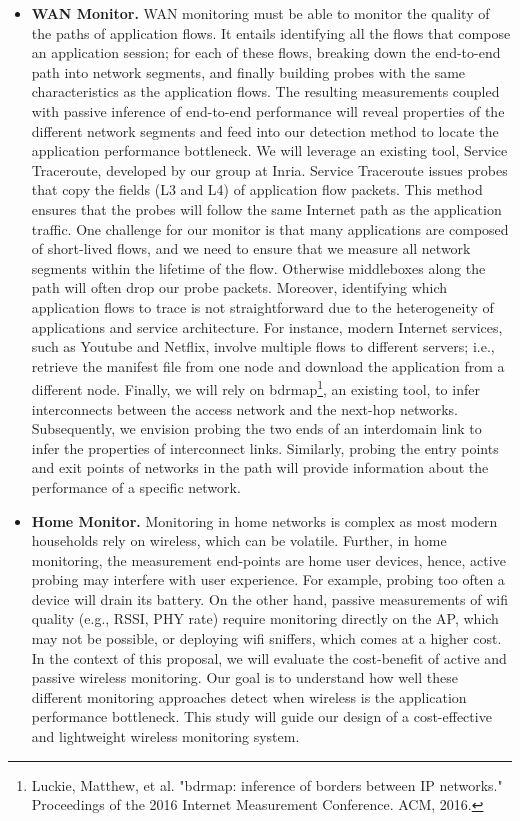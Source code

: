\documentclass[11 pt]{article}
\begin{document}
\begin{itemize}
\item \textbf{WAN Monitor.} WAN monitoring must be able to monitor the quality of the paths of application flows. It entails identifying all the flows that compose an application session; for each of these flows, breaking down the end-to-end path into network segments, and finally building probes with the same characteristics as the application flows. The resulting measurements coupled with passive inference of end-to-end performance will reveal properties of the different network segments and feed into our detection method to locate the application performance bottleneck. We will leverage an existing tool, Service Traceroute, developed by our group at Inria. Service Traceroute issues probes that copy the fields (L3 and L4) of application flow packets. This method ensures that the probes will follow the same Internet path as the application traffic. One challenge for our monitor is that many applications are composed of short-lived flows, and we need to ensure that we measure all network segments within the lifetime of the flow. Otherwise middleboxes along the path will often drop our probe packets. Moreover, identifying which application flows to trace is not straightforward due to the heterogeneity of applications and service architecture. For instance, modern Internet services, such as Youtube and Netflix, involve multiple flows to different servers; i.e., retrieve the manifest file from one node and download the application from a different node. Finally, we will rely on bdrmap\footnote{Luckie, Matthew, et al. "bdrmap: inference of borders between IP networks." Proceedings of the 2016 Internet Measurement Conference. ACM, 2016.}, an existing tool, to infer interconnects between the access network and the next-hop networks. Subsequently, we envision probing the two ends of an interdomain link to infer the properties of interconnect links. Similarly, probing the entry points and exit points of networks in the path will provide information about the performance of a specific network.

\item \textbf{Home Monitor.} Monitoring in home networks is complex as most modern households rely on wireless, which can be volatile. Further, in home monitoring, the measurement end-points are home user devices, hence, active probing may interfere with user experience. For example, probing too often a device will drain its battery. On the other hand, passive measurements of wifi quality (e.g., RSSI, PHY rate) require monitoring directly on the AP, which may not be possible, or deploying wifi sniffers, which comes at a higher cost. In the context of this proposal, we will evaluate the cost-benefit of active and passive wireless monitoring. Our goal is to understand how well these different monitoring approaches detect when wireless is the application performance bottleneck. This study will guide our design of a cost-effective and lightweight wireless monitoring system.


\end{itemize}
\end{document}
